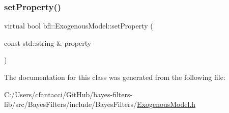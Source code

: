 \mbox{\label{classbfl_1_1ExogenousModel_a240432e20121e83787c83de64360a58a}} 
\subsubsection{\texorpdfstring{set\+Property()}{setProperty()}}
{\footnotesize\ttfamily virtual bool bfl\+::\+Exogenous\+Model\+::set\+Property (\begin{DoxyParamCaption}\item[{const std\+::string \&}]{property }\end{DoxyParamCaption})\hspace{0.3cm}{\ttfamily [pure virtual]}}



The documentation for this class was generated from the following file\+:\begin{DoxyCompactItemize}
\item 
C\+:/\+Users/cfantacci/\+Git\+Hub/bayes-\/filters-\/lib/src/\+Bayes\+Filters/include/\+Bayes\+Filters/\mbox{\hyperlink{ExogenousModel_8h}{Exogenous\+Model.\+h}}\end{DoxyCompactItemize}
